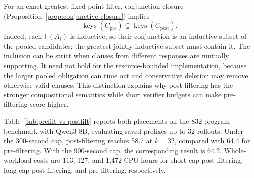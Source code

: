 For an exact greatest-fixed-point filter, conjunction closure
(Proposition~\ref{prop:conjunctive-closure}) implies
\begin{equation}
  \operatorname{keys}(C_{\mathrm{pre}})
  \subseteq \operatorname{keys}(C_{\mathrm{post}}).
  \label{eq:ideal-pre-post-inclusion}
\end{equation}
Indeed, each \(\mathsf F(A_i)\) is inductive, so their conjunction is an
inductive subset of the pooled candidates; the greatest jointly inductive
subset must contain it.  The inclusion can be strict when clauses from
different responses are mutually supporting.  It need not hold for the
resource-bounded implementation, because the larger pooled obligation can
time out and conservative deletion may remove otherwise valid clauses.  This
distinction explains why post-filtering has the stronger compositional
semantics while short verifier budgets can make pre-filtering score higher.

Table~\ref{tab:prefilt-vs-postfilt} reports both placements on the 832-program
benchmark with Qwen3-8B, evaluating saved prefixes up to 32 rollouts.  Under
the 300-second cap, post-filtering reaches 58.7 at \(k{=}32\),
compared with 64.4 for pre-filtering.  With the 900-second cap, the
corresponding result is 64.2.  Whole-workload costs are 113, 127, and 1,472
CPU-hours for short-cap post-filtering, long-cap post-filtering, and
pre-filtering, respectively.

